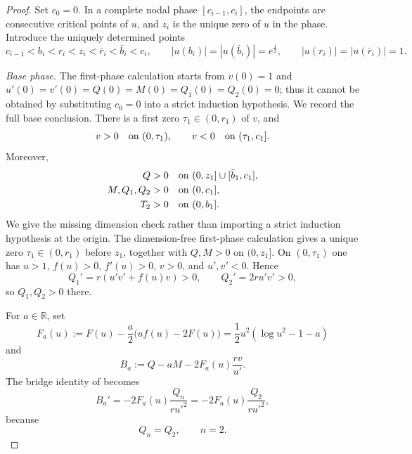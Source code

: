 \documentclass[11pt]{article}
\begin{document}
\begin{proof}
Set $c_0=0$. In a complete nodal phase $[c_{i-1},c_i]$, the endpoints
are consecutive critical points of $u$, and $z_i$ is the unique zero of
$u$ in the phase.  Introduce the uniquely determined points
\[
 c_{i-1}<b_i<r_i<z_i<\bar r_i<\bar b_i<c_i,
 \qquad
 |u(b_i)|=|u(\bar b_i)|=e^{\frac{1}{2}},
 \qquad
 |u(r_i)|=|u(\bar r_i)|=1.
\]

\medskip
\noindent\emph{Base phase.}
The first-phase calculation starts from $v(0)=1$ and
$u'(0)=v'(0)=Q(0)=M(0)=Q_1(0)=Q_2(0)=0$; thus it cannot be obtained by
substituting $c_0=0$ into a strict induction hypothesis. We record the full
base conclusion. There is a first zero $\tau_1\in(0,r_1)$ of $v$, and
\begin{equation}\label{eq:planar-base-v}
 v>0\quad\hbox{on }(0,\tau_1),
 \qquad v<0\quad\hbox{on }(\tau_1,c_1].
\end{equation}
Moreover,
\begin{align}
 Q&>0\quad \hbox{on }(0,z_1]\cup[\bar b_1,c_1],\label{eq:planar-base-Q}\\
 M,Q_1,Q_2&>0\quad\hbox{on }(0,c_1],\label{eq:planar-base-M}\\
 T_2&>0\quad\hbox{on }(0,b_1].\label{eq:planar-base-T}
\end{align}
We give the missing dimension check rather than importing a strict induction
hypothesis at the origin. The dimension-free first-phase calculation
\cite[Proposition~3.2]{LiuSunZou} gives a unique zero
$\tau_1\in(0,r_1)$ before $z_1$, together with
$Q,M>0$ on $(0,z_1]$. On $(0,\tau_1)$ one has
$u>1$, $f(u)>0$, $f'(u)>0$, $v>0$, and $u',v'<0$. Hence
\[
 Q_1'=r(u'v'+f(u)v)>0,
 \qquad Q_2'=2ru'v'>0,
\]
so $Q_1,Q_2>0$ there.

For $a\in\mathbb R$, set
\begin{equation*}
 F_a(u):=F(u)-\frac a2\bigl(uf(u)-2F(u)\bigr)
       =\frac12u^2(\log u^2-1-a)
\end{equation*}
and
\begin{equation*}
 B_a:=Q-aM-2F_a(u)\frac{rv}{u'}.
\end{equation*}
The bridge identity of \cite{LiuSunZou} becomes
\begin{equation}\label{eq:planar-Baprime}
 B_a'=-2F_a(u)\frac{Q_n}{r u'^2}
     =-2F_a(u)\frac{Q_2}{r u'^2},
\end{equation}
because
\begin{equation*}
 Q_n=Q_2,\qquad n=2.
\end{equation*}


\end{proof}
\end{document}
